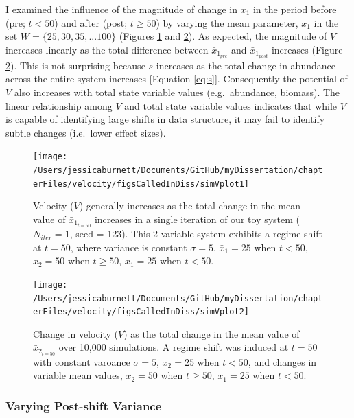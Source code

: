 \documentclass[12pt,twoside,openany]{reedthesis}
\begin{document}
I examined the influence of the magnitude of change in \(x_1\) in the period before (pre; \(t <50\)) and after (post; \(t \geq 50\)) by varying the mean parameter, \(\bar{x}_1\) in the set \(W=\{25,30,35,...100 \}\) (Figures \ref{fig:simVplot1} and \ref{fig:simVplot2}). As expected, the magnitude of \(V\) increases linearly as the total difference between \(\bar{x}_{1_{pre}}\) and \(\bar{x}_{1_{post}}\) increases (Figure \ref{fig:simVplot2}). This is not surprising because \(s\) increases as the total change in abundance across the entire system increases {[}Equation \eqref{eq:s}{]}. Consequently the potential of \(V\) also increases with total state variable values (e.g.~abundance, biomass). The linear relationship among \(V\) and total state variable values indicates that while \(V\) is capable of identifying large shifts in data structure, it may fail to identify subtle changes (i.e.~lower effect sizes).
\begin{figure}
\texttt{[image: /Users/jessicaburnett/Documents/GitHub/myDissertation/chapterFiles/velocity/figsCalledInDiss/simVplot1]} \caption{Velocity ($V$) generally increases as the total change in the mean value of $\bar{x}_{1_{t=50}}$ increases in a single iteration of our toy system ($N_{iter}=1$, seed = 123). This 2-variable system exhibits a regime shift at $t=50$, where variance is constant $\sigma = 5$, $\bar{x}_1 = 25$ when $t<50$,  $\bar{x}_2=50$ when $t\geq50$, $\bar{x}_1 = 25$ when $t <50$.}\label{fig:simVplot1}
\end{figure}
\begin{figure}
\texttt{[image: /Users/jessicaburnett/Documents/GitHub/myDissertation/chapterFiles/velocity/figsCalledInDiss/simVplot2]} \caption{Change in velocity ($V$) as the total change in the mean value of $\bar{x}_{2_{t=50}}$ over 10,000 simulations. A regime shift was induced at $t=50$ with constant varoance $\sigma = 5$, $\bar{x}_2 = 25$ when $t<50$,  and changes in variable mean values, $\bar{x}_2 = 50$ when $t \geq 50$, $\bar{x}_1 = 25$ when $t<50$.}\label{fig:simVplot2}
\end{figure}
\hypertarget{varying-post-shift-variance}{%
\subsubsection{Varying Post-shift Variance}\label{varying-post-shift-variance}}
\end{document}
